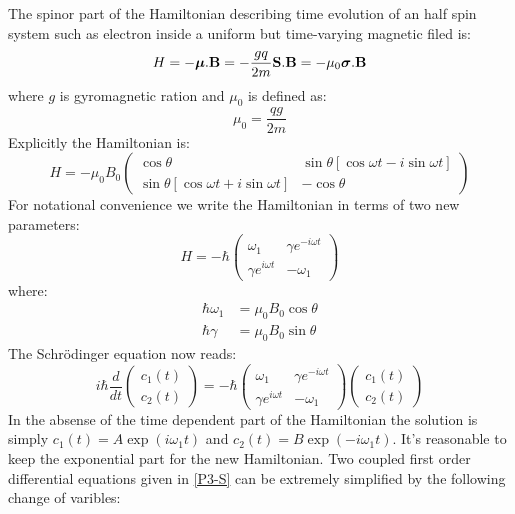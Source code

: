 \begin{homeworkProblem}
The spinor part of the Hamiltonian describing time evolution of  an half spin system such as electron inside a uniform but time-varying magnetic filed is:
\begin{equation}
H=-\boldsymbol{\mu}.\mathbf{B}=-\frac{gq}{2m}\mathbf{S}.\mathbf{B}=-\mu_0\boldsymbol{\sigma}.\mathbf{B}
\end{equation}
 where $g$ is gyromagnetic ration and $\mu_0$ is defined as:
 \begin{equation}
 \mu_0=\frac{qg}{2m}
 \end{equation}
Explicitly the Hamiltonian is:
\begin{equation}
H=-\mu_0B_0
\begin{pmatrix}
\cos\theta & \sin\theta\left[\cos\omega t-i\sin\omega t\right]\\
\sin\theta\left[\cos\omega t+i\sin\omega t\right] & -\cos\theta
\end{pmatrix}
\end{equation} 
For notational convenience we write the Hamiltonian in terms of two new parameters:
\begin{equation}
H=-\hbar
\begin{pmatrix}
\omega_1              & \gamma e^{-i\omega t}\\
\gamma e^{i\omega t} & -\omega_1 
\end{pmatrix}
\end{equation}
where:
\begin{align*}
\hbar\omega_1 &=\mu_0B_0\cos\theta\\
 \hbar\gamma &=\mu_0B_0\sin\theta
\end{align*}
The Schr\"odinger equation now reads:
\begin{equation}\label{P3-S}
i\hbar\frac{d}{dt}
\begin{pmatrix}
c_1(t)\\
c_2(t)
\end{pmatrix}
=
-\hbar\begin{pmatrix}
\omega_1              & \gamma e^{-i\omega t}\\
\gamma e^{i\omega t} & -\omega_1 
\end{pmatrix}
\begin{pmatrix}
c_1(t)\\
c_2(t)
\end{pmatrix}
\end{equation}
In the absense of the time dependent part of the Hamiltonian the solution is simply $c_1(t)=A\exp(i\omega_1 t)$ and $c_2(t)=B\exp(-i\omega_1 t)$. It's reasonable to keep the exponential part for the new Hamiltonian. Two coupled first order differential equations given in \eqref{P3-S} can be extremely simplified by the following change of varibles:

\end{homeworkProblem}
